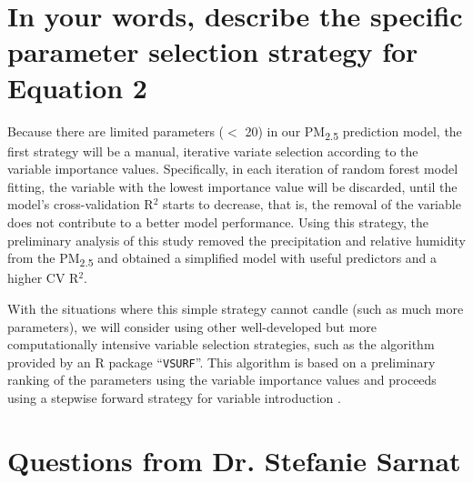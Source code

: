 \documentclass[11pt]{article}
\newcommand{\tsub}{\textsubscript}
\begin{document}
\section{In your words, describe the specific parameter selection strategy for Equation 2}
\begin{enumerate*}[{[1)]}]
    \item Because there are limited parameters ($<$ 20) in our PM\tsub{2.5} prediction model, the first strategy will be a manual, iterative variate selection according to the variable importance values. Specifically, in each iteration of random forest model fitting, the variable with the lowest importance value will be discarded, until the model's cross-validation R$^2$ starts to decrease, that is, the removal of the variable does not contribute to a better model performance. Using this strategy, the preliminary analysis of this study removed the precipitation and relative humidity from the PM\tsub{2.5} and obtained a simplified model with useful predictors and a higher CV R$^2$. 
    \item With the situations where this simple strategy cannot candle (such as much more parameters), we will consider using other well-developed but more computationally intensive variable selection strategies, such as the algorithm provided by an R package ``\texttt{VSURF}''. This algorithm is based on a preliminary ranking of the parameters using the variable importance values and proceeds using a stepwise forward strategy for variable introduction \citep{genuer2015vsurf}.
\end{enumerate*}



\hdashrule{\textwidth}{0.1pt}{0.6mm 0.6mm}
\setcounter{section}{0}

\section*{Questions from Dr. Stefanie Sarnat}
\end{document}
